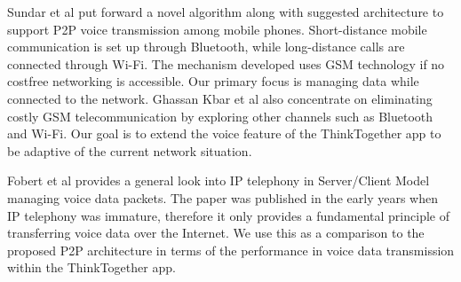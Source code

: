 Sundar et al \cite{SMPM_VoIP_ICAESM12} put forward a novel algorithm along with
suggested architecture
to support P2P voice transmission among mobile phones.  Short-distance mobile
communication is set up through Bluetooth, while long-distance calls are
connected through Wi-Fi. The mechanism developed uses GSM technology if no
costfree networking is accessible. Our primary focus is managing data while
connected to the network.  Ghassan
Kbar et al \cite{GWA_P2P_VoIP_ICWMC10} also concentrate on eliminating costly
GSM telecommunication by
exploring other channels such as Bluetooth and Wi-Fi.  Our goal is to extend
the
voice feature of the ThinkTogether app to be adaptive of the current network
situation.

Fobert et al \cite{JSPS_USPatent05} provides a general look into IP telephony
in Server/Client
Model managing voice data packets.  The paper was published in the early years when
IP telephony was immature, therefore it only provides a fundamental principle of
transferring voice data over the Internet. We use this as a comparison to the
proposed P2P architecture in terms of the performance in voice data transmission
within the ThinkTogether app.




